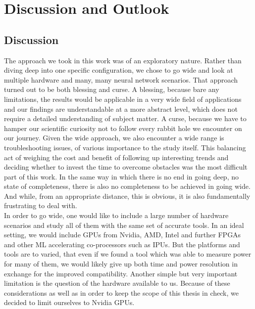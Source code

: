 \chapter{Discussion and Outlook}\label{chap:discussion}

\section{Discussion}

The approach we took in this work was of an exploratory nature. Rather than diving deep into one specific configuration, we chose to go wide and look at multiple hardware and many, many neural network scenarios. That approach turned out to be both blessing and curse. A blessing, because bare any limitations, the results would be applicable in a very wide field of applications and our findings are understandable at a more abstract level, which does not require a detailed understanding of subject matter. A curse, because we have to hamper our scientific curiosity not to follow every rabbit hole we encounter on our journey. Given the wide approach, we also encounter a wide range is troubleshooting issues, of various importance to the study itself. This balancing act of weighing the cost and benefit of following up interesting trends and deciding whether to invest the time to overcome obstacles was the most difficult part of this work. In the same way in which there is no end in going deep, no state of completeness, there is also no completeness to be achieved in going wide. And while, from an appropriate distance, this is obvious, it is also fundamentally frustrating to deal with.\\
In order to go wide, one would like to include a large number of hardware scenarios and study all of them with the same set of accurate tools. In an ideal setting, we would include GPUs from Nvidia, AMD, Intel and further FPGAs and other ML accelerating co-processors such as IPUs. But the platforms and tools are to varied, that even if we found a tool which was able to measure power for many of them, we would likely give up both time and power resolution in exchange for the improved compatibility. Another simple but very important limitation is the question of the hardware available to us. Because of these considerations as well as in order to keep the scope of this thesis in check, we decided to limit ourselves to Nvidia GPUs. \\
